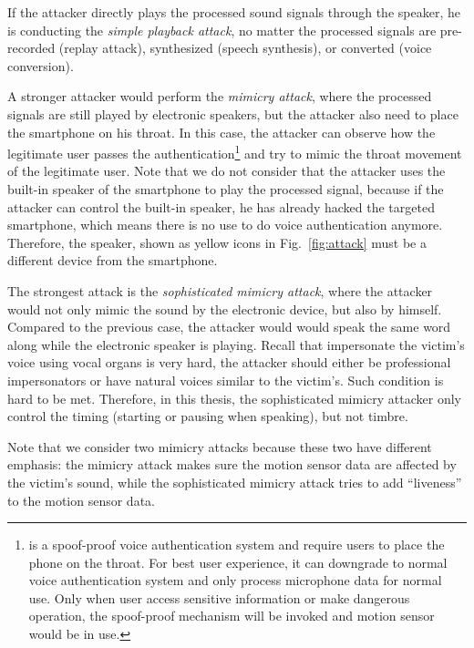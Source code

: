 If the attacker directly plays the processed sound signals through the speaker, he is conducting the \textit{simple playback attack}, no matter the processed signals are pre-recorded (replay attack), synthesized (speech synthesis), or converted (voice conversion).

A stronger attacker would perform the \textit{mimicry attack}, where the processed signals are still played by electronic speakers, but the attacker also need to place the smartphone on his throat. In this case, the attacker can observe how the legitimate user passes the authentication\footnote{{\shortname} is a spoof-proof voice authentication system and require users to place the phone on the throat. For best user experience, it can downgrade to normal voice authentication system and only process microphone data for normal use. Only when user access sensitive information or make dangerous operation, the spoof-proof mechanism will be invoked and motion sensor would be in use.} and try to mimic the throat movement of the legitimate user. Note that we do not consider that the attacker uses the built-in speaker of the smartphone to play the processed signal, because if the attacker can control the built-in speaker, he has already hacked the targeted smartphone, which means there is no use to do voice authentication anymore. Therefore, the speaker, shown as yellow icons in Fig.~\ref{fig:attack} must be a different device from the smartphone.


The strongest attack is the \textit{sophisticated mimicry attack}, where the attacker would not only mimic the sound by the electronic device, but also by himself. Compared to the previous case, the attacker would would speak the same word along while the electronic speaker is playing. Recall that impersonate the victim's voice using vocal organs is very hard, the attacker should either be professional impersonators or have natural voices similar to the victim's. Such condition is hard to be met. Therefore, in this thesis, the sophisticated mimicry attacker only control the timing (starting or pausing when speaking), but not timbre.

Note that we consider two mimicry attacks because these two have different emphasis: the 
mimicry attack makes sure the motion sensor data are affected by the victim's sound, while the sophisticated mimicry attack tries to add ``liveness'' to the motion sensor data. %


 